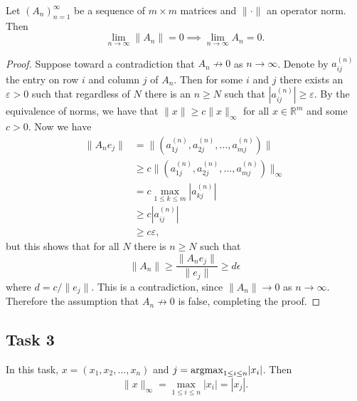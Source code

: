 \documentclass[a4paper,12pt]{article}
\begin{document}
\begin{proposition}
  Let \((A_n)_{n=1}^\infty\) be a sequence of \(m \times m\) matrices and
  \(\|\cdot\|\) an operator norm.
  Then
  \[ \lim_{n \to \infty} \|A_n\| = 0 \implies \lim_{n \to \infty} A_n = 0. \]
\end{proposition}
\begin{proof}
  Suppose toward a contradiction that \(A_n \not \to 0\) as \(n \to \infty\).
  Denote by \(a_{ij}^{(n)}\) the entry on row \(i\) and column \(j\) of \(A_n\).
  Then for some \(i\) and \(j\) there exists an \(\varepsilon > 0\) such that
  regardless of \(N\) there is an \(n \ge N\) such that
  \(|a_{ij}^{(n)}| \ge \varepsilon\).
  By the equivalence of norms, we have that \(\|x\| \ge c\|x\|_\infty\) for all
  \(x \in \mathbb{R}^m\) and some \(c > 0\).
  Now we have
  \begin{align*}
    \|A_n e_j\|
      &= \|(a^{(n)}_{1j}, a^{(n)}_{2j}, \dots, a^{(n)}_{mj})\| \\
      &\ge c\|(a^{(n)}_{1j}, a^{(n)}_{2j}, \dots, a^{(n)}_{mj})\|_\infty \\
      &= c \max_{1 \le k \le m} |a_{kj}^{(n)}| \\
      &\ge c |a^{(n)}_{ij}| \\
      &\ge c \varepsilon,
  \end{align*}
  but this shows that for all \(N\) there is \(n \ge N\) such that
  \[
    \|A_n\|
      \ge \frac{\|A_n e_j\|}{\|e_j\|}
      \ge d\epsilon
  \]
  where \(d = c/\|e_j\|\).
  This is a contradiction, since \(\|A_n\| \to 0\) as \(n \to \infty\).
  Therefore the assumption that \(A_n \not \to 0\) is false, completing the
  proof.
\end{proof}


\subsection*{Task 3}

In this task, \(x = (x_1,x_2,\dots,x_n)\) and
\(j = \mathrm{argmax}_{1 \le i \le n} |x_i|\).
Then
\[ \|x\|_\infty = \max_{1 \le i \le n} |x_i| = |x_j|. \]
\end{document}

